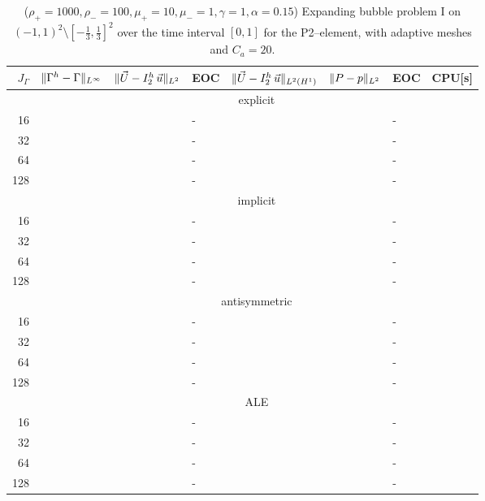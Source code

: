\begin{table}
\center
\hspace*{-3.25cm}
\begin{tabular}{rllllllr}
\hline
$J_\Gamma$ & $\|\Gamma^h - \Gamma\|_{L^\infty}$ & $\|\vec U - I^h_{2}\,\vec u\|_{L^2}$ & EOC & $\|\vec U - I^h_{2}\,\vec u\|_{L^2(H^1)}$ & $\|P - p\|_{L^2}$ & EOC
& CPU[s] \\
\hline
& \multicolumn{7}{c}{explicit} \\
\hline
 16 & & & - & & & - & \\
 32 & & & - & & & - & \\
 64 & & & - & & & - & \\
128 & & & - & & & - & \\
\hline
& \multicolumn{7}{c}{implicit} \\
\hline
 16 & & & - & & & - & \\
 32 & & & - & & & - & \\
 64 & & & - & & & - & \\
128 & & & - & & & - & \\
\hline
& \multicolumn{7}{c}{antisymmetric} \\
\hline
 16 & & & - & & & - & \\
 32 & & & - & & & - & \\
 64 & & & - & & & - & \\
128 & & & - & & & - & \\
\hline
& \multicolumn{7}{c}{ALE} \\
\hline
 16 & & & - & & & - & \\
 32 & & & - & & & - & \\
 64 & & & - & & & - & \\
128 & & & - & & & - & \\
\hline
\end{tabular}
\hspace*{-3.25cm}
\caption[Navier--Stokes expanding bubble I errors P2--\pdg]
{($\rho_+ = 1000,\rho_- = 100,\mu_+ = 10,\mu_- =1,\gamma = 1,\alpha=0.15$)
Expanding bubble problem I on $(-1,1)^2\setminus[-\frac{1}{3},\frac{1}{3}]^2$
over the time interval $[0,1]$ for the P2--\pdg element, with adaptive
meshes and $C_a=20$\textdegree.}
\label{tab:nsexpandingbubbleIp2p1dg}
\end{table}

